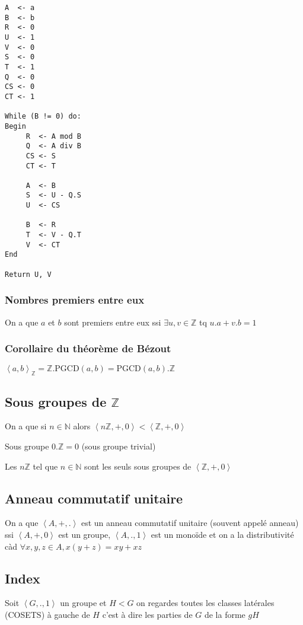 \documentclass[a4paper,10pt]{article}
\newcommand{\grp}[1]{\left\langle #1 \right\rangle}
\newcommand{\N}{\mathbb{N}}
\newcommand{\Z}{\mathbb{Z}}
\newcommand{\PGCD}{\mbox{PGCD}}
\begin{document}
\begin{verbatim}
A  <- a
B  <- b
R  <- 0
U  <- 1
V  <- 0
S  <- 0
T  <- 1
Q  <- 0
CS <- 0
CT <- 1

While (B != 0) do:
Begin
     R  <- A mod B
     Q  <- A div B
     CS <- S
     CT <- T

     A  <- B
     S  <- U - Q.S
     U  <- CS

     B  <- R
     T  <- V - Q.T
     V  <- CT
End

Return U, V
\end{verbatim}

\subsubsection{Nombres premiers entre eux}

On a que $a$ et $b$ sont premiers entre eux ssi $\exists u,v \in \Z$ tq $u.a + v.b = 1$

\subsubsection{Corollaire du théorème de Bézout}

$\grp{a,b}_{\Z} = \Z.\PGCD(a,b) = \PGCD(a,b).\Z$

\subsection{Sous groupes de $\Z$}

On a que si $n \in \N$ alors $\grp{n \Z, +, 0} < \grp{\Z,+,0}$

Sous groupe $0.\Z = 0$ (sous groupe trivial)

Les $n \Z$ tel que $n \in \N$ sont les seuls sous groupes de $\grp{\Z,+,0}$

\subsection{Anneau commutatif unitaire}

On a que $\grp{A,+,.}$ est un anneau commutatif unitaire (souvent appelé anneau) ssi $\grp{A,+,0}$ est un groupe, $\grp{A,.,1}$ est un monoïde et on a la distributivité càd $\forall x,y,z \in A, x(y+z) = xy + xz$

\subsection{Index}

Soit $\grp{G,.,1}$ un groupe et $H < G$ on regardes toutes les classes latérales (COSETS) à gauche de $H$ c'est à dire les parties de $G$ de la forme $gH$
\end{document}
